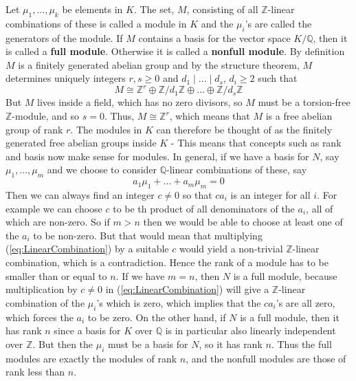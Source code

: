 \documentclass{article}
\newtheorem{definition}{Definition}[section]
\newcommand{\mbb}[1]{\mathbb{#1}}
\begin{document}
Let $\mu_1, ..., \mu_k$ be elements in $K$. The set, $M$, consisting of all $\mbb{Z}$-linear combinations of these is called a module in $K$ and the $\mu_i$'s are called the generators of the module. If $M$ contains a basis for the vector space $K / \mbb{Q}$, then it is called a \textbf{full module}. Otherwise it is called a \textbf{nonfull module}. By definition $M$ is a finitely generated abelian group and by the structure theorem, $M$ determines uniquely integers $r,s \geq 0$ and $d_1 \mid ... \mid d_s$, $d_i \geq 2$ such that
$$M \cong \mbb{Z}^r \oplus \mbb{Z}/d_1\mbb{Z} \oplus ... \oplus \mbb{Z}/d_s\mbb{Z} $$
But $M$ lives inside a field, which has no zero divisors, so $M$ must be a torsion-free $\mbb{Z}$-module, and so $s = 0$. Thus, $M \cong \mbb{Z}^r$, which means that $M$ is a free abelian group of rank $r$. The modules in $K$ can therefore be thought of as the finitely generated free abelian groups inside $K$ - This means that concepts such as rank and basis now make sense for modules. 
In general, if we have a basis for $N$, say $\mu_1, ..., \mu_m$ and we choose to consider $\mbb Q$-linear combinations of these, say 
\begin{equation} \label{eq:LinearCombination}
    a_1 \mu_1 + ... + a_m \mu_m = 0 
\end{equation}
Then we can always find an integer $c \neq 0$ so that $c a_i$ is an integer for all $i$. For example we can choose $c$ to be th product of all denominators of the $a_i$, all of which are non-zero. So if $m > n$ then we would be able to choose at least one of the $a_i$ to be non-zero. But that would mean that multiplying (\ref{eq:LinearCombination}) by a suitable $c$ would yield a non-trivial $\mbb Z$-linear combination, which is a contradiction. Hence the rank of a module has to be smaller than or equal to $n$. If we have $m = n$, then $N$ is a full module, because multiplication by $c \neq 0$ in (\ref{eq:LinearCombination}) will give a $\mbb Z$-linear combination of the $\mu_i$'s which is zero, which implies that the $ca_i$'s are all zero, which forces the $a_i$ to be zero. On the other hand, if $N$ is a full module, then it has rank $n$ since a basis for $K$ over $\mbb Q$ is in particular also linearly independent over $\mbb Z$. But then the $\mu_i$ must be a basis for $N$, so it has rank $n$. Thus the full modules are exactly the modules of rank $n$, and the nonfull modules are those of rank less than $n$.
\end{document}
